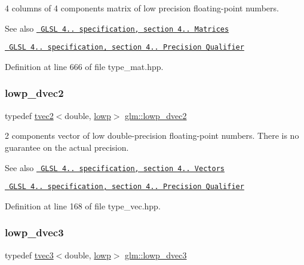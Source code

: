 4 columns of 4 components matrix of low precision floating-\/point numbers.

\begin{DoxySeeAlso}{See also}
\href{http://www.opengl.org/registry/doc/GLSLangSpec.4.20.8.pdf}{\texttt{ G\+L\+SL 4.. specification, section 4.. Matrices}} 

\href{http://www.opengl.org/registry/doc/GLSLangSpec.4.20.8.pdf}{\texttt{ G\+L\+SL 4.. specification, section 4.. Precision Qualifier}} 
\end{DoxySeeAlso}


Definition at line 666 of file type\+\_\+mat.\+hpp.

\mbox{\label{group__core__precision_ga26ff2843d850f4f6ad591540e1ff1818}} 
\subsubsection{\texorpdfstring{lowp\_dvec2}{lowp\_dvec2}}
{\footnotesize\ttfamily typedef \mbox{\hyperlink{structglm_1_1tvec2}{tvec2}}$<$double, \mbox{\hyperlink{namespaceglm_a0f04f086094c747d227af4425893f545ae161af3fc695e696ce3bf69f7332bc2d}{lowp}}$>$ \mbox{\hyperlink{group__core__precision_ga26ff2843d850f4f6ad591540e1ff1818}{glm\+::lowp\+\_\+dvec2}}}

2 components vector of low double-\/precision floating-\/point numbers. There is no guarantee on the actual precision.

\begin{DoxySeeAlso}{See also}
\href{http://www.opengl.org/registry/doc/GLSLangSpec.4.20.8.pdf}{\texttt{ G\+L\+SL 4.. specification, section 4.. Vectors}} 

\href{http://www.opengl.org/registry/doc/GLSLangSpec.4.20.8.pdf}{\texttt{ G\+L\+SL 4.. specification, section 4.. Precision Qualifier}} 
\end{DoxySeeAlso}


Definition at line 168 of file type\+\_\+vec.\+hpp.

\mbox{\label{group__core__precision_ga88d318815a9af448bddcb16fceb155c5}} 
\subsubsection{\texorpdfstring{lowp\_dvec3}{lowp\_dvec3}}
{\footnotesize\ttfamily typedef \mbox{\hyperlink{structglm_1_1tvec3}{tvec3}}$<$double, \mbox{\hyperlink{namespaceglm_a0f04f086094c747d227af4425893f545ae161af3fc695e696ce3bf69f7332bc2d}{lowp}}$>$ \mbox{\hyperlink{group__core__precision_ga88d318815a9af448bddcb16fceb155c5}{glm\+::lowp\+\_\+dvec3}}}

